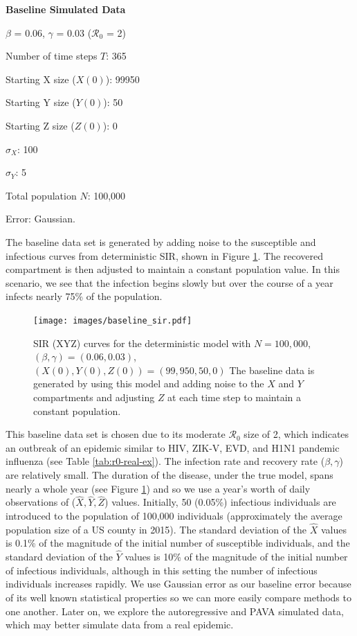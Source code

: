 \documentclass[12pt]{article}
\newcommand{\rr}{\ensuremath{\mathcal{R}_0}}
\begin{document}
\noindent \textbf{Baseline Simulated Data}
\begin{center}
	
	$\beta$ = 0.06, $\gamma$ = 0.03 ($\rr$ = 2)
	
	Number of time steps $T$: 365
	
	Starting X size ($X(0)$): 99950
	
	Starting Y size ($Y(0)$): 50
	
	Starting Z size ($Z(0)$): 0 
	
	$\sigma_X$: 100
	
	$\sigma_Y$: 5
	
	Total population $N$: 100,000

        Error: Gaussian.
	
      \end{center}
      The baseline data set is generated by adding noise to the susceptible and infectious curves from  deterministic SIR, shown in Figure \ref{fig:baseline-data}.  The recovered compartment is then adjusted to maintain a constant population value.  In this scenario, we see that the infection begins slowly but over the course of a year infects nearly 75\% of the population.
      \begin{figure}
        \centering
        \texttt{[image: images/baseline\_sir.pdf]}
        \caption{SIR (XYZ) curves for the deterministic model with $N=100,000$, $(\beta, \gamma) = (0.06, 0.03)$, $(X(0), Y(0), Z(0))= (99,950, 50,0)$  The baseline data is generated by using this model and adding noise to the $X$ and $Y$ compartments and adjusting $Z$ at each time step to maintain a constant population.}\label{fig:baseline-data}
        \end{figure}
      This baseline data set is chosen due to its moderate $\rr$ size of 2, which indicates an outbreak of an epidemic similar to HIV, ZIK-V, EVD, and H1N1 pandemic influenza (see Table \ref{tab:r0-real-ex}).  The infection rate and recovery rate ($\beta, \gamma$) are relatively small.  The duration of the disease, under the true model, spans nearly a whole year (see Figure \ref{fig:baseline-data}) and so we use a year's worth of daily observations of ($\hat{X},\hat{Y}, \hat{Z}$) values.  Initially, 50 (0.05\%) infectious individuals are introduced to the population of 100,000 individuals (approximately the average population size of a US county in 2015).  The standard deviation of the $\hat{X}$ values is 0.1\% of the magnitude of the initial number of susceptible individuals, and the standard deviation of the $\hat{Y}$ values is 10\% of the magnitude of the initial number of infectious individuals, although in this setting the number of infectious individuals increases rapidly.  We use Gaussian error as our baseline error because of its well known statistical properties so we can more easily compare methods to one another.  Later on, we explore the autoregressive and PAVA simulated data, which may better simulate data from  a real epidemic.
\end{document}
